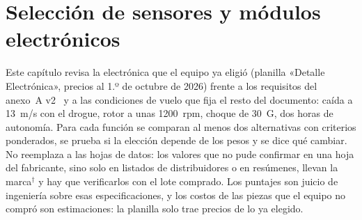 \chapter{Selección de sensores y módulos electrónicos}\label{cap:sensores}
\providecommand{\nv}{$^{\dagger}$}

Este capítulo revisa la electrónica que el equipo ya eligió (planilla «Detalle Electrónica»,
precios al 1.º de octubre de 2026) frente a los requisitos del anexo~A v2~\cite{anexo} y a las
condiciones de vuelo que fija el resto del documento: caída a \SI{13}{m/s} con el drogue, rotor
a unas \SI{1200}{rpm}, choque de \SI{30}{G}, dos horas de autonomía. Para cada función se
comparan al menos dos alternativas con criterios ponderados, se prueba si la elección
depende de los pesos y se dice qué cambiar. No reemplaza a las hojas de datos: los valores que
no pude confirmar en una hoja del fabricante, sino solo en listados de distribuidores o en
resúmenes, llevan la marca\nv{} y hay que verificarlos con el lote comprado. Los puntajes son
juicio de ingeniería sobre esas especificaciones, y los costos de las piezas que el equipo no
compró son estimaciones: la planilla solo trae precios de lo ya elegido.

